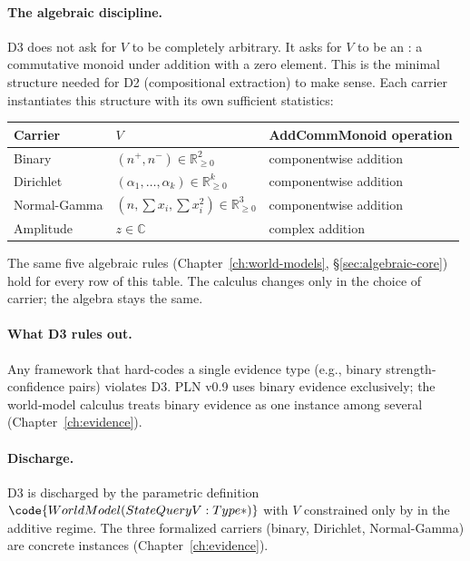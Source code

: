 \paragraph{The algebraic discipline.}
D3 does not ask for $V$ to be completely arbitrary.  It asks for $V$ to
be an : a commutative monoid under addition with a
zero element.  This is the minimal structure needed for D2
(compositional extraction) to make sense.  Each carrier instantiates
this structure with its own sufficient statistics:

\begin{center}
\begin{tabular}{lll}
\toprule
\textbf{Carrier} & \textbf{$V$} & \textbf{AddCommMonoid operation} \\
\midrule
Binary & $(n^+, n^-) \in \mathbb{R}_{\ge 0}^2$
  & componentwise addition \\
Dirichlet & $(\alpha_1, \ldots, \alpha_k) \in \mathbb{R}_{\ge 0}^k$
  & componentwise addition \\
Normal-Gamma & $(n, \sum x_i, \sum x_i^2) \in \mathbb{R}_{\ge 0}^3$
  & componentwise addition \\
Amplitude & $z \in \mathbb{C}$
  & complex addition \\
\bottomrule
\end{tabular}
\end{center}

\noindent
The same five algebraic rules (Chapter~\ref{ch:world-models},
\S\ref{sec:algebraic-core}) hold for every row of this table.  The
calculus changes only in the choice of carrier; the algebra stays
the same.

\paragraph{What D3 rules out.}
Any framework that hard-codes a single evidence type (e.g., binary
strength-confidence pairs) violates D3.  PLN v0.9 uses binary evidence
exclusively; the world-model calculus treats binary evidence as one
instance among several (Chapter~\ref{ch:evidence}).

\paragraph{Discharge.}
D3 is discharged by the parametric definition
$\code{WorldModel (State Query V : Type*)}$ with $V$ constrained
only by \code{[AddCommMonoid V]} in the additive regime.  The three
formalized carriers (binary, Dirichlet, Normal-Gamma) are concrete
instances (Chapter~\ref{ch:evidence}).

